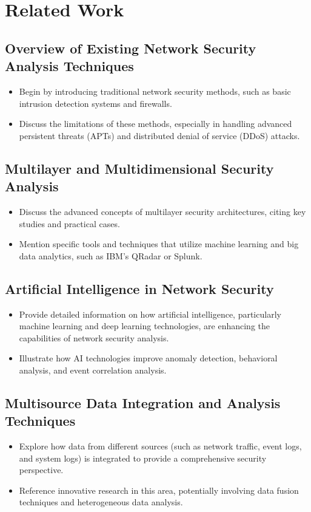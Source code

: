 \section{Related Work}

\subsection{Overview of Existing Network Security Analysis Techniques}
\begin{itemize}
    \item Begin by introducing traditional network security methods, such as basic intrusion detection systems and firewalls.
    \item Discuss the limitations of these methods, especially in handling advanced persistent threats (APTs) and distributed denial of service (DDoS) attacks.
\end{itemize}


\subsection{Multilayer and Multidimensional Security Analysis}
\begin{itemize}
    \item Discuss the advanced concepts of multilayer security architectures, citing key studies and practical cases.
    \item Mention specific tools and techniques that utilize machine learning and big data analytics, such as IBM's QRadar or Splunk.
\end{itemize}

\subsection{Artificial Intelligence in Network Security}
\begin{itemize}
    \item Provide detailed information on how artificial intelligence, particularly machine learning and deep learning technologies, are enhancing the capabilities of network security analysis.
    \item Illustrate how AI technologies improve anomaly detection, behavioral analysis, and event correlation analysis.
\end{itemize}

\subsection{Multisource Data Integration and Analysis Techniques}
\begin{itemize}
    \item Explore how data from different sources (such as network traffic, event logs, and system logs) is integrated to provide a comprehensive security perspective.
    \item Reference innovative research in this area, potentially involving data fusion techniques and heterogeneous data analysis.
\end{itemize}

